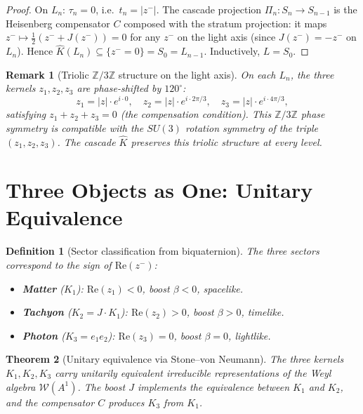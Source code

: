 \documentclass[12pt,a4paper]{article}
\newtheorem{theorem}{Theorem}[section]
\newtheorem{definition}[theorem]{Definition}
\newtheorem*{remark}{Remark}
\newcommand{\zminus}{z^-}
\newcommand{\WA}{\mathcal{W}(A^1)}
\newcommand{\KC}{\hat{K}}
\begin{document}
\begin{proof}
On $L_n$: $\tau_n=0$, i.e.\ $t_n=|\zminus|$.
The cascade projection $\Pi_n:S_n\to S_{n-1}$ is the Heisenberg
compensator $C$ composed with the stratum projection: it maps
$\zminus\mapsto\tfrac{1}{2}(\zminus+J(\zminus))=0$ for any $\zminus$
on the light axis (since $J(\zminus)=-\zminus$ on $L_n$).
Hence $\KC(L_n)\subseteq\{\zminus=0\}=S_0=L_{n-1}$.
Inductively, $L=S_0$.
\end{proof}

\begin{remark}[Triolic $\mathbb{Z}/3\mathbb{Z}$ structure on the light axis]
On each $L_n$, the three kernels $z_1,z_2,z_3$ are phase-shifted by $120^\circ$:
\[
  z_1=|z|\cdot e^{i\cdot 0},\quad
  z_2=|z|\cdot e^{i\cdot 2\pi/3},\quad
  z_3=|z|\cdot e^{i\cdot 4\pi/3},
\]
satisfying $z_1+z_2+z_3=0$ (the compensation condition).
This $\mathbb{Z}/3\mathbb{Z}$ phase symmetry is compatible with the
$SU(3)$ rotation symmetry of the triple $(z_1,z_2,z_3)$.
The cascade $\KC$ preserves this triolic structure at every level.
\end{remark}


\section{Three Objects as One: Unitary Equivalence}
\label{sec:unitary}

\begin{definition}[Sector classification from biquaternion]
The three sectors correspond to the sign of $\mathrm{Re}(\zminus)$:
\begin{itemize}
  \item \textbf{Matter} ($K_1$): $\mathrm{Re}(z_1)<0$, boost $\beta<0$, spacelike.
  \item \textbf{Tachyon} ($K_2=J\cdot K_1$): $\mathrm{Re}(z_2)>0$, boost $\beta>0$, timelike.
  \item \textbf{Photon} ($K_3=e_1 e_2$): $\mathrm{Re}(z_3)=0$, boost $\beta=0$, lightlike.
\end{itemize}
\end{definition}

\begin{theorem}[Unitary equivalence via Stone--von Neumann]\label{thm:unitary-equiv}
The three kernels $K_1,K_2,K_3$ carry unitarily equivalent
irreducible representations of the Weyl algebra $\WA$.
The boost $J$ implements the equivalence between $K_1$ and $K_2$,
and the compensator $C$ produces $K_3$ from $K_1$.
\end{theorem}
\end{document}
